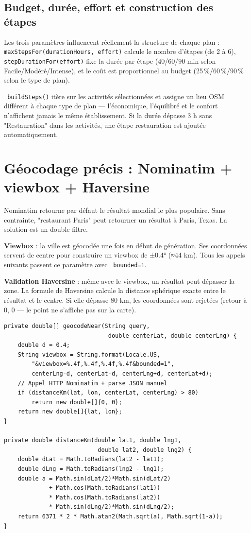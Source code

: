 \documentclass[a4paper,12pt,openany]{report}
\newcommand{\ic}[1]{\texttt{\small\colorbox{lightbg}{\color{navy!90} #1}}}
\begin{document}
\subsection{Budget, durée, effort et construction des étapes}

Les trois paramètres influencent réellement la structure de chaque plan :
\ic{maxStepsFor(durationHours, effort)} calcule le nombre d'étapes (de 2 à 6),
\ic{stepDurationFor(effort)} fixe la durée par étape (40/60/90 min selon Facile/Modéré/Intense),
et le coût est proportionnel au budget (25\,\%/60\,\%/90\,\% selon le type de plan).

\ic{buildSteps()} itère sur les activités sélectionnées et assigne un lieu OSM différent
à chaque type de plan — l'économique, l'équilibré et le confort n'affichent jamais
le même établissement. Si la durée dépasse 3 h sans "Restauration" dans les activités,
une étape restauration est ajoutée automatiquement.

\section{Géocodage précis : Nominatim + viewbox + Haversine}

Nominatim retourne par défaut le résultat mondial le plus populaire. Sans
contrainte, "restaurant Paris" peut retourner un résultat à Paris, Texas.
La solution est un double filtre.

\textbf{Viewbox} : la ville est géocodée une fois en début de génération.
Ses coordonnées servent de centre pour construire un viewbox de ±0.4°
(≈44 km). Tous les appels suivants passent ce paramètre avec \ic{bounded=1}.

\textbf{Validation Haversine} : même avec le viewbox, un résultat peut
dépasser la zone. La formule de Haversine calcule la distance sphérique exacte
entre le résultat et le centre. Si elle dépasse 80 km, les coordonnées sont
rejetées (retour à 0, 0 — le point ne s'affiche pas sur la carte).

\begin{lstlisting}
private double[] geocodeNear(String query,
                              double centerLat, double centerLng) {
    double d = 0.4;
    String viewbox = String.format(Locale.US,
        "&viewbox=%.4f,%.4f,%.4f,%.4f&bounded=1",
        centerLng-d, centerLat-d, centerLng+d, centerLat+d);
    // Appel HTTP Nominatim + parse JSON manuel
    if (distanceKm(lat, lon, centerLat, centerLng) > 80)
        return new double[]{0, 0};
    return new double[]{lat, lon};
}

private double distanceKm(double lat1, double lng1,
                           double lat2, double lng2) {
    double dLat = Math.toRadians(lat2 - lat1);
    double dLng = Math.toRadians(lng2 - lng1);
    double a = Math.sin(dLat/2)*Math.sin(dLat/2)
             + Math.cos(Math.toRadians(lat1))
             * Math.cos(Math.toRadians(lat2))
             * Math.sin(dLng/2)*Math.sin(dLng/2);
    return 6371 * 2 * Math.atan2(Math.sqrt(a), Math.sqrt(1-a));
}
\end{lstlisting}
\end{document}
